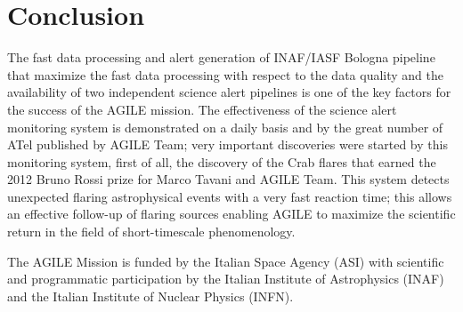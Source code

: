 \section{Conclusion}

The fast data processing and alert generation of INAF/IASF Bologna pipeline that maximize the fast data processing with respect to the data quality and the availability of two independent science alert pipelines is one of the key factors for the success of the AGILE mission. The effectiveness of the science alert monitoring system is demonstrated on a daily basis and by the great number of ATel published by AGILE Team; very important discoveries were started by this monitoring system, first of all, the discovery of the Crab flares that earned the 2012 Bruno Rossi prize for Marco Tavani and AGILE Team. This system detects unexpected flaring astrophysical events with a very fast reaction time; this allows an effective follow-up of flaring sources enabling AGILE to maximize the scientific return in the field of short-timescale phenomenology.

\acknowledgements The AGILE Mission is funded by the Italian Space Agency (ASI) with scientific and programmatic participation by the Italian Institute of Astrophysics (INAF) and the Italian Institute of Nuclear Physics (INFN). 



